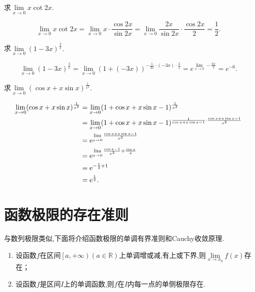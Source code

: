 	\begin{example}
		求$\lim\limits_{x\to 0}x\cot 2x$.
	\end{example}
	\begin{solution}
		\[
		\lim\limits_{x\to 0}x\cot 2x=\lim\limits_{x\to 0}x\cdot\frac{\cos 2x}{\sin 2x}=\lim\limits_{x\to 0}\frac{2x}{\sin2x}\cdot\frac{\cos2x}{2}=\frac{1}{2}.
		\]
	\end{solution}

	\begin{example}
		求$\lim\limits_{x\to 0}(1-3x)^{\frac{2}{x}}.$
	\end{example}
	\begin{solution}
		\[
		\lim\limits_{x\to 0}(1-3x)^{\frac{2}{x}}=\lim\limits_{x\to 0}(1+(-3x))^{-\frac{1}{3x} \cdot (-3x) \cdot \frac{2}{x}}=e^{\lim\limits_{x\to 0}-\frac{6x}{x}}=e^{-6}. 
		\]
	\end{solution}

	\begin{example}
		求$\lim\limits_{x\to 0}(\cos x+x\sin x)^{\frac{1}{x^2}}.$
	\end{example}
	\begin{solution}
		\begin{align*}
		\lim\limits_{x\to 0}(\cos x+x\sin x)^{\frac{1}{x^2}}&=\lim\limits_{x\to 0}(1+\cos x+x\sin x-1)^{\frac{1}{x^2}}\\
		& = \lim\limits_{x\to 0}(1+\cos x+x\sin x-1)^{\frac{1}{\cos x+x\sin x-1}\cdot \frac{\cos x+x\sin x-1}{x^2}}\\
		& = {\rm e}^{\lim\limits_{x\to 0}\frac{\cos x+x\sin x-1}{x^2}}\\
		& = {\rm e}^{\lim\limits_{x\to 0}\frac{\cos x-1}{x^2}+\frac{\sin x}{x}}\\
		& = {\rm e}^{-\frac{1}{2}+ 1}\\
		& = {\rm e}^{\frac{1}{2}}.
		\end{align*}
	\end{solution}
	
	\section{函数极限的存在准则}
	与数列极限类似,下面将介绍函数极限的单调有界准则和Cauchy收敛原理.
	\begin{theorem}
		
			\begin{enumerate}
				\item 	设函数$f$在区间$\left[a,+\infty \right) \left(a\in \mathbb{R} \right)$上单调增或减,有上或下界,则$\lim\limits_{x\to x_0}f(x)$存在；
				\item 	设函数$f$是区间$I$上的单调函数,则$f$在$I$内每一点的单侧极限存在.
			\end{enumerate}
	\end{theorem}

